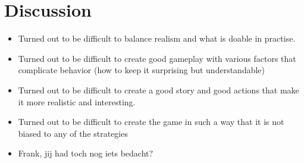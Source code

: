 \documentclass[11pt,a4paper]{article}
\begin{document}
\section{Discussion}
  \begin{itemize}
    \item Turned out to be difficult to balance realism and what is doable in practise.
    \item Turned out to be difficult to create good gameplay with various factors that complicate behavior (how to keep it surprising but understandable)
    \item Turned out to be difficult to create a good story and good actions that make it more realistic and interesting.
    \item Turned out to be difficult to create the game in such a way that it is not biased to any of the strategies
    \item Frank, jij had toch nog iets bedacht?
  \end{itemize}
\end{document}
